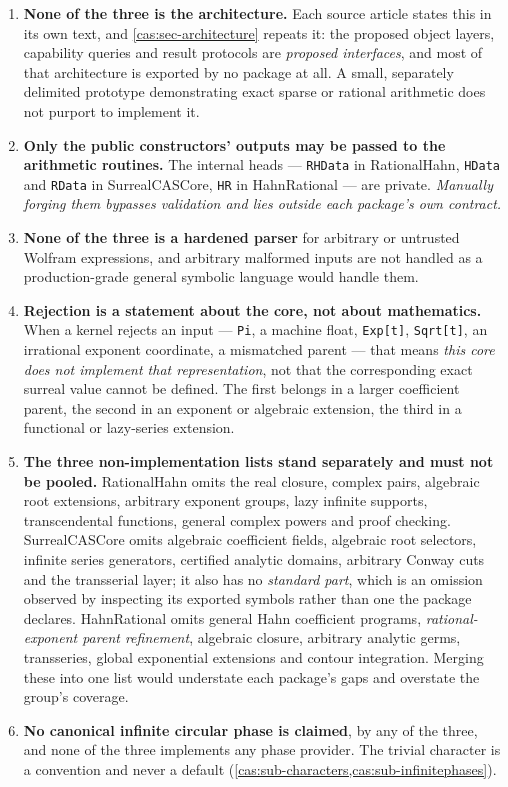 \documentclass[11pt,letterpaper]{article}
\numberwithin{equation}{section}
\theoremstyle{definition}
\theoremstyle{remark}
\begin{document}
\begin{enumerate}
\item \textbf{None of the three is the architecture.} Each source article states
this in its own text, and \cref{cas:sec-architecture} repeats it: the proposed
object layers, capability queries and result protocols are \emph{proposed
interfaces}, and most of that architecture is exported by no package at all. A
small, separately delimited prototype demonstrating exact sparse or rational
arithmetic does not purport to implement it.
\item \textbf{Only the public constructors' outputs may be passed to the
arithmetic routines.} The internal heads --- \texttt{RHData} in RationalHahn,
\texttt{HData} and \texttt{RData} in SurrealCASCore, \texttt{HR} in
HahnRational --- are private. \emph{Manually forging them bypasses validation
and lies outside each package's own contract.}
\item \textbf{None of the three is a hardened parser} for arbitrary or untrusted
Wolfram expressions, and arbitrary malformed inputs are not handled as a
production-grade general symbolic language would handle them.
\item \textbf{Rejection is a statement about the core, not about mathematics.}
When a kernel rejects an input --- \texttt{Pi}, a machine float,
\texttt{Exp[t]}, \texttt{Sqrt[t]}, an irrational exponent coordinate, a
mismatched parent --- that means \emph{this core does not implement that
representation}, not that the corresponding exact surreal value cannot be
defined. The first belongs in a larger coefficient parent, the second in an
exponent or algebraic extension, the third in a functional or lazy-series
extension.
\item \textbf{The three non-implementation lists stand separately and must not
be pooled.} RationalHahn omits the real closure, complex pairs, algebraic root
extensions, arbitrary exponent groups, lazy infinite supports, transcendental
functions, general complex powers and proof checking. SurrealCASCore omits
algebraic coefficient fields, algebraic root selectors, infinite series
generators, certified analytic domains, arbitrary Conway cuts and the transserial
layer; it also has no \emph{standard part}, which is an omission observed by
inspecting its exported symbols rather than one the package declares. HahnRational omits general Hahn coefficient
programs, \emph{rational-exponent parent refinement}, algebraic closure,
arbitrary analytic germs, transseries, global exponential extensions and contour
integration. Merging these into one list would understate each package's gaps
and overstate the group's coverage.
\item \textbf{No canonical infinite circular phase is claimed}, by any of the
three, and none of the three implements any phase provider. The trivial
character is a convention and never a default
(\cref{cas:sub-characters,cas:sub-infinitephases}).
\end{enumerate}
\end{document}
